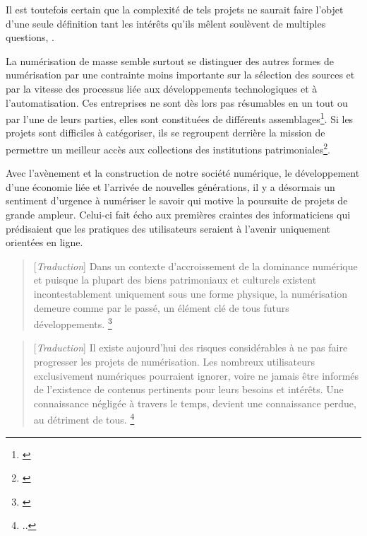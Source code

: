 Il est toutefois certain que la complexité de tels projets ne saurait faire l'objet d'une seule définition tant les intérêts qu'ils mêlent soulèvent de multiples questions, . 

La numérisation de masse semble surtout se distinguer des autres formes de numérisation par une contrainte moins importante sur la sélection des sources et par la vitesse des processus liée aux développements technologiques et à l'automatisation. Ces entreprises ne sont dès lors pas résumables en un tout ou par l'une de leurs parties, elles sont constituées de différents assemblages\footnote{\cite[p.26]{thylstrup_politics_2018}}. Si les projets sont difficiles à catégoriser, ils se regroupent derrière la mission de permettre un meilleur accès aux collections des institutions patrimoniales\footnote{\cite[p.58]{lampert_ramping_2018}}.

Avec l'avènement et la construction de notre société numérique, le développement d'une économie liée et l'arrivée de nouvelles générations, il y a désormais un sentiment d'urgence à numériser le savoir qui motive la poursuite de projets de grande ampleur. Celui-ci fait écho aux premières craintes des informaticiens qui prédisaient que les pratiques des utilisateurs seraient à l'avenir uniquement orientées en ligne.

\begin{quotation}
[\textit{Traduction}]
Dans un contexte d'accroissement de la dominance numérique et puisque la plupart des biens patrimoniaux et culturels existent incontestablement uniquement sous une forme physique, la numérisation demeure comme par le passé, un élément clé de tous futurs développements.
\footnote{\cite[p.4]{coutts_stepping_2017}}
\end{quotation}

\begin{quotation}
[\textit{Traduction}]
Il existe aujourd'hui des risques considérables à ne pas faire progresser les projets de numérisation. Les nombreux utilisateurs exclusivement numériques pourraient ignorer, voire ne jamais être informés de l'existence de contenus pertinents pour leurs besoins et intérêts. Une connaissance négligée à travers le temps, devient une connaissance perdue, au détriment de tous.
\footnote{.\cite[p.4]{coutts_stepping_2017}.}
\end{quotation}

